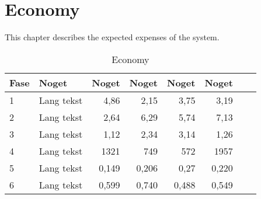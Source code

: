 \chapter{Economy}

This chapter describes the expected expenses of the system.

\begin{table}[H]
\begin{tabularx}{\textwidth}{lXrrrrrr} 
Fase & Noget & Noget & Noget & Noget & Noget\\ \toprule
1 & Lang tekst & 4,86 & 2,15 & 3,75 & 3,19\\
\midrule
2 & Lang tekst & 2,64 & 6,29 & 5,74 & 7,13\\
\midrule
3 & Lang tekst & 1,12 & 2,34 & 3,14 & 1,26\\
\midrule
4 & Lang tekst & 1321 & 749 & 572 & 1957\\
\midrule
5 & Lang tekst & 0,149 & 0,206 & 0,27 & 0,220\\
\midrule
6 & Lang tekst & 0,599 & 0,740 & 0,488 & 0,549\\
\bottomrule
\end{tabularx}
\caption{Economy}
\label{tab:EconomyTable}
\end{table}